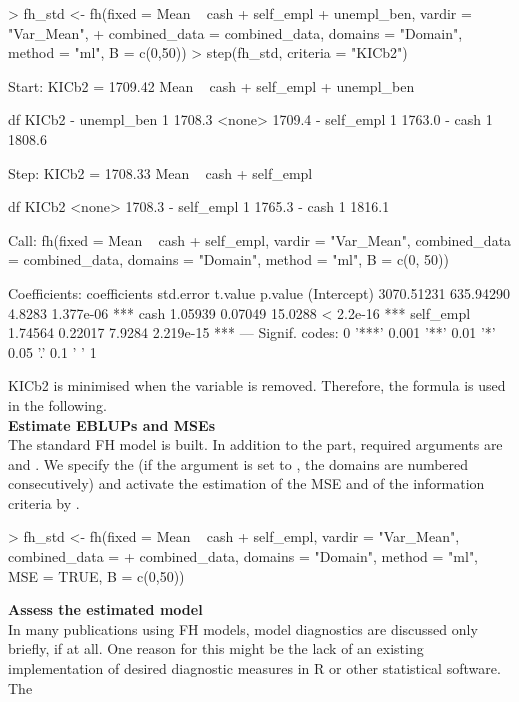 \begin{example}
> fh_std <- fh(fixed = Mean ~ cash + self_empl + unempl_ben, vardir = "Var_Mean",
+   combined_data = combined_data, domains = "Domain", method = "ml", B = c(0,50))
> step(fh_std, criteria = "KICb2")

Start: KICb2 = 1709.42
Mean ~ cash + self_empl + unempl_ben

            df  KICb2
- unempl_ben 1 1708.3
<none>         1709.4
- self_empl  1 1763.0
- cash       1 1808.6

Step: KICb2 = 1708.33
Mean ~ cash + self_empl

            df  KICb2
<none>         1708.3
- self_empl  1 1765.3
- cash       1 1816.1


Call:
fh(fixed = Mean ~ cash + self_empl, vardir = "Var_Mean",
    combined_data = combined_data,
    domains = "Domain", method = "ml", B = c(0, 50))

Coefficients:
             coefficients  std.error t.value   p.value
(Intercept)   3070.51231  635.94290  4.8283 1.377e-06 ***
cash             1.05939    0.07049 15.0288 < 2.2e-16 ***
self_empl        1.74564    0.22017  7.9284 2.219e-15 ***
---
Signif. codes: 0 '***' 0.001 '**' 0.01 '*' 0.05 '.' 0.1 ' ' 1
\end{example}
KICb2 is minimised when the variable  is removed. Therefore,
the formula  is used in the following.\\ \newline
\textbf{Estimate EBLUPs and MSEs} \\
The standard FH model is built. In addition to the  part, required
arguments are  and . We specify the 
(if the  argument is set to , the domains are numbered
consecutively) and activate the estimation of the MSE and of the information criteria by \citet{Marhuenda2014}.
\begin{example}
> fh_std <- fh(fixed = Mean ~ cash + self_empl, vardir = "Var_Mean", combined_data =
+   combined_data, domains = "Domain", method = "ml", MSE = TRUE, B = c(0,50))
\end{example}
\textbf{Assess the estimated model} \\
In many publications using FH models, model diagnostics are discussed only briefly, if at all. One reason for this might be the lack of an existing implementation of desired diagnostic measures in R or other statistical software. The 
